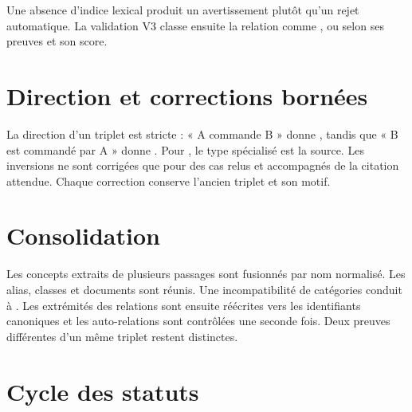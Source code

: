 Une absence d'indice lexical produit un avertissement plutôt qu'un rejet automatique. La validation V3 classe ensuite la relation comme ,  ou  selon ses preuves et son score.

\section{Direction et corrections bornées}

La direction d'un triplet est stricte : « A commande B » donne , tandis que « B est commandé par A » donne . Pour , le type spécialisé est la source. Les inversions ne sont corrigées que pour des cas relus et accompagnés de la citation attendue. Chaque correction conserve l'ancien triplet et son motif.

\section{Consolidation}

Les concepts extraits de plusieurs passages sont fusionnés par nom normalisé. Les alias, classes et documents sont réunis. Une incompatibilité de catégories conduit à . Les extrémités des relations sont ensuite réécrites vers les identifiants canoniques et les auto-relations sont contrôlées une seconde fois. Deux preuves différentes d'un même triplet restent distinctes.

\section{Cycle des statuts}

\begin{center}
\end{center}

